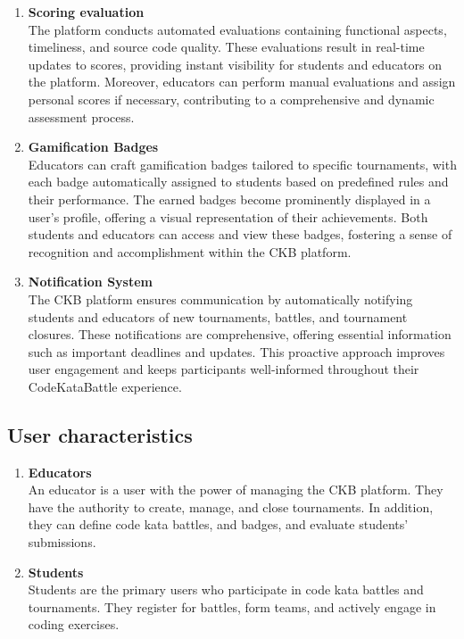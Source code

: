 \begin{enumerate}
    \item \textbf{Scoring evaluation} \\
    The platform conducts automated evaluations containing functional aspects, timeliness, and source code quality. These evaluations result in real-time updates to scores, providing instant visibility for students and educators on the platform. Moreover, educators can perform manual evaluations and assign personal scores if necessary, contributing to a comprehensive and dynamic assessment process.
    
    \item \textbf{Gamification Badges} \\
    Educators can craft gamification badges tailored to specific tournaments, with each badge automatically assigned to students based on predefined rules and their performance. The earned badges become prominently displayed in a user's profile, offering a visual representation of their achievements. Both students and educators can access and view these badges, fostering a sense of recognition and accomplishment within the CKB platform.    

    \item \textbf{Notification System} \\
    The CKB platform ensures communication by automatically notifying students and educators of new tournaments, battles, and tournament closures. These notifications are comprehensive, offering essential information such as important deadlines and updates. This proactive approach improves user engagement and keeps participants well-informed throughout their CodeKataBattle experience.
    
\end{enumerate}


\subsection{User characteristics}

\begin{enumerate}
    \item \textbf{Educators} \\
    An educator is a user with the power of managing the CKB platform. They have the authority to create, manage, and close tournaments. In addition, they can define code kata battles, and badges, and evaluate students' submissions.

    \item \textbf{Students} \\
     Students are the primary users who participate in code kata battles and tournaments. They register for battles, form teams, and actively engage in coding exercises.
        
\end{enumerate}

